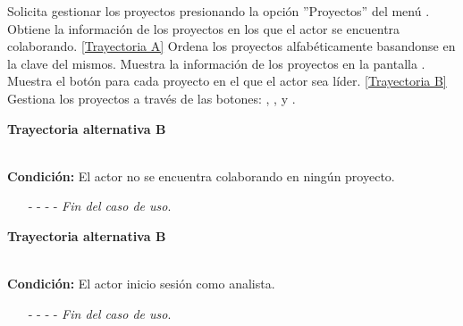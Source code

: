 \begin{UCtrayectoria}
	\UCpaso[\UCactor] Solicita gestionar los proyectos presionando la opción ''Proyectos'' del menú .
	\UCpaso[\UCsist] Obtiene la información de los proyectos en los que el actor se encuentra colaborando. \hyperlink{CU4:TAA}{[Trayectoria A]}
	\UCpaso[\UCsist] Ordena los proyectos alfabéticamente basandonse en la clave del mismos.
	\UCpaso[\UCsist] Muestra la información de los proyectos en la pantalla . \label{CU4-P3}
	\UCpaso[\UCsist] Muestra el botón  para cada proyecto en el que el actor sea líder. \hyperlink{CU4:TAB}{[Trayectoria B]}
	\UCpaso[\UCactor] Gestiona los proyectos a través de las botones: , ,  y . \label{CU4-P5}
\end{UCtrayectoria}		
\hypertarget{CU4:TAA}{\textbf{Trayectoria alternativa B}}\\
\noindent \textbf{Condición:} El actor no se encuentra colaborando en ningún proyecto.
\begin{enumerate}
	\UCpaso[\UCsist] Muestra el mensaje  en la pantalla  para indicar que no hay registros de proyectos para mostrar.
	\item[- -] - - {\em {Fin del caso de uso}}.%
\end{enumerate}


\hypertarget{CU4:TAB}{\textbf{Trayectoria alternativa B}}\\
\noindent \textbf{Condición:} El actor inicio sesión como analista.
\begin{enumerate}
	\UCpaso[\UCactor] Gestiona los proyectos a través de las botones: ,  y . \label{CU4-TB1}
	\item[- -] - - {\em {Fin del caso de uso}}.%
\end{enumerate}

